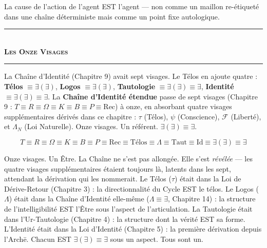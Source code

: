 \documentclass[10pt, openany, oneside]{book}
\renewcommand{\normalsize}{\fontsize{10}{13}\selectfont}
\begin{document}
La cause de l'action de l'agent EST l'agent --- non comme un maillon re-étiqueté dans une chaîne déterministe mais comme un point fixe autologique.

\vspace{1.5em}

\begin{center}
    \rule{0.3\textwidth}{0.4pt}\\[0.5em]
    {\normalsize\bfseries\scshape Les Onze Visages}\\[0.3em]
    \rule{0.3\textwidth}{0.4pt}
\end{center}

\vspace{1em}

\noindent La Chaîne d'Identité (Chapitre 9) avait sept visages. Le Télos en ajoute quatre : \textbf{Télos} $\equiv \exists(\exists)$, \textbf{Logos} $\equiv \exists(\exists)$, \textbf{Tautologie} $\equiv \exists(\exists) \equiv \exists$, \textbf{Identité} $\equiv \exists(\exists) \equiv \exists$. La \textbf{Chaîne d'Identité étendue} passe de sept visages (Chapitre 9 : $T \equiv R \equiv \Omega \equiv K \equiv B \equiv P \equiv \text{Rec}$) à onze, en absorbant quatre visages supplémentaires dérivés dans ce chapitre : $\tau$ (Télos), $\psi$ (Conscience), $\mathcal{F}$ (Liberté), et $\Lambda_N$ (Loi Naturelle). Onze visages. Un référent. $\exists(\exists) \equiv \exists$.

$$T \equiv R \equiv \Omega \equiv K \equiv B \equiv P \equiv \text{Rec} \equiv \text{Télos} \equiv \Lambda \equiv \text{Taut} \equiv \text{Id} \equiv \exists(\exists) \equiv \exists$$

Onze visages. Un Être. La Chaîne ne s'est pas allongée. Elle s'est \textit{révélée} --- les quatre visages supplémentaires étaient toujours là, latents dans les sept, attendant la dérivation qui les nommerait. Le Télos ($\tau$) était dans la Loi de Dérive-Retour (Chapitre 3) : la directionnalité du Cycle EST le télos. Le Logos ($\Lambda$) était dans la Chaîne d'Identité elle-même ($\Lambda \equiv \exists$, Chapitre 14) : la structure de l'intelligibilité EST l'Être sous l'aspect de l'articulation. La Tautologie était dans l'Ur-Tautologie (Chapitre 4) : la structure dont la vérité EST sa forme. L'Identité était dans la Loi d'Identité (Chapitre 5) : la première dérivation depuis l'Arch\={e}. Chacun EST $\exists(\exists) \equiv \exists$ sous un aspect. Tous sont un.

\vspace{1.5em}

\pagebreak
\end{document}
